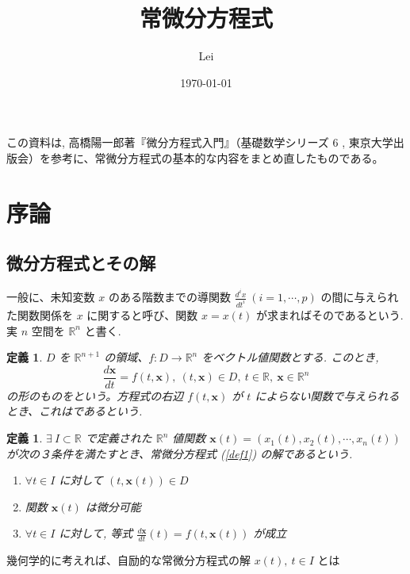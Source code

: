 \documentclass[dvipdfmx, a4paper]{jsarticle}
\title{常微分方程式}
\author{Lei}
\date{\today}
\newcommand{\R}{\mathbb{R}}
\newcommand{\x}{\bm{x}}
\newtheorem{definition}[theorem]{定義}
\begin{document}
\maketitle

この資料は, 高橋陽一郎著『微分方程式入門』（基礎数学シリーズ 6 , 東京大学出版会）を参考に、常微分方程式の基本的な内容をまとめ直したものである。

\section{序論}

\subsection{微分方程式とその解}

一般に、未知変数 $x$ のある階数までの導関数 $\frac{d^ix}{dt^i}\ (i=1, \cdots, p)$ の間に与えられた関数関係を $x$ に関すると呼び、関数 $x=x(t)$ が求まればそのであるという. 実 $n$ 空間を $\R^n$ と書く.

\begin{definition}
    $D$ を $\R^{n+1}$ の領域、$f: D\to \R^n$ をベクトル値関数とする. このとき,
    \begin{equation}
        \label{def1}
        \frac{d\x}{dt}=f(t, \x),\ (t, \x)\in D,\ t\in\R,\ \x\in\R^n
    \end{equation}
    の形のものをという。方程式の右辺 $f(t, \x)$ が $t$ によらない関数で与えられるとき、これはであるという.
\end{definition}

\begin{definition}
    $\exists\ I\subset\R$ で定義された $\R^n$ 値関数 $\x(t)=(x_1(t), x_2(t), \cdots, x_n(t))$ が次の３条件を満たすとき、常微分方程式 (\ref{def1}) の解であるという.
    \begin{enumerate}
        \item $\forall t\in I$ に対して $(t, \x(t))\in D$
        \item 関数 $\x(t)$ は微分可能
        \item $\forall t\in I$ に対して, 等式 $\frac{d\x}{dt}(t)=f(t, \x(t))$ が成立
    \end{enumerate}
\end{definition}

幾何学的に考えれば、自励的な常微分方程式の解 $x(t),\ t\in I$ とは
\end{document}
